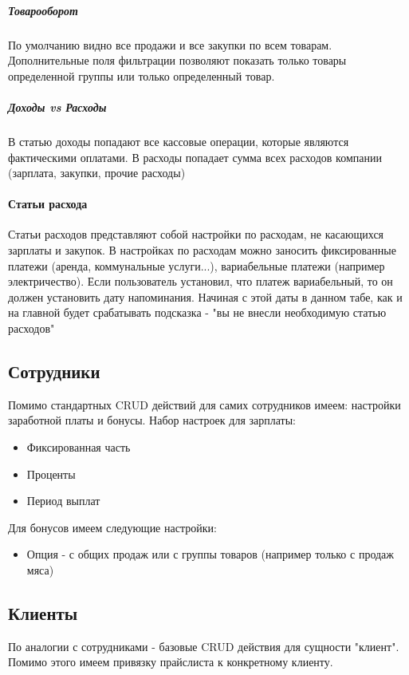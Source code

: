 \documentclass[DIV=calc, paper=a4, fontsize=11pt]{scrartcl} %
\begin{document}
\subparagraph{Товарооборот}
По умолчанию видно все продажи и все закупки по всем товарам. Дополнительные поля фильтрации позволяют показать только товары определенной группы или только определенный товар.

\subparagraph{Доходы vs Расходы}
В статью доходы попадают все кассовые операции, которые являются фактическими оплатами. В расходы попадает сумма всех расходов компании (зарплата, закупки, прочие расходы)

\paragraph{Статьи расхода}
Статьи расходов представляют собой настройки по расходам, не касающихся зарплаты и закупок. В настройках по расходам можно заносить фиксированные платежи (аренда, коммунальные услуги...), вариабельные платежи (например электричество). Если пользователь установил, что платеж вариабельный, то он должен установить дату напоминания. Начиная с этой даты в данном табе, как и на главной будет срабатывать подсказка - "вы не внесли необходимую статью расходов"



\subsection{Сотрудники}

Помимо стандартных CRUD действий для самих сотрудников имеем: настройки заработной платы и бонусы. Набор настроек для зарплаты:

\begin{itemize}
	\item Фиксированная часть
	\item Проценты
	\item Период выплат
\end{itemize}

Для бонусов имеем следующие настройки:

\begin{itemize}
	\item Опция - с общих продаж или с группы товаров (например только с продаж мяса)
\end{itemize}

\subsection{Клиенты}

По аналогии с сотрудниками - базовые CRUD действия для сущности "клиент". Помимо этого имеем привязку прайслиста к конкретному клиенту.
\end{document}

